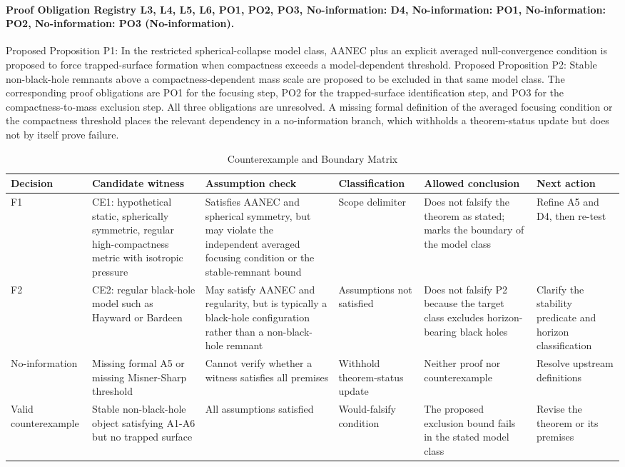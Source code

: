 \documentclass[conference]{IEEEtran}
\begin{document}
\paragraph{Proof Obligation Registry L3, L4, L5, L6, PO1, PO2, PO3, No-information: D4, No-information: PO1, No-information: PO2, No-information: PO3 (No-information).} Proposed Proposition P1: In the restricted spherical-collapse model class, AANEC plus an explicit averaged null-convergence condition is proposed to force trapped-surface formation when compactness exceeds a model-dependent threshold. Proposed Proposition P2: Stable non-black-hole remnants above a compactness-dependent mass scale are proposed to be excluded in that same model class. The corresponding proof obligations are PO1 for the focusing step, PO2 for the trapped-surface identification step, and PO3 for the compactness-to-mass exclusion step. All three obligations are unresolved. A missing formal definition of the averaged focusing condition or the compactness threshold places the relevant dependency in a no-information branch, which withholds a theorem-status update but does not by itself prove failure.

\begin{table}[htbp]
\centering
\footnotesize
\setlength{\tabcolsep}{3pt}
\renewcommand{\arraystretch}{1.12}
\caption{Counterexample and Boundary Matrix}
\label{tab:forward-derivation-and-counterexamples-b6}
\begin{tabular}{|p{}|p{}|p{}|p{}|p{}|p{}|}
\hline
Decision & Candidate witness & Assumption check & Classification & Allowed conclusion & Next action \\\hline
F1 & CE1: hypothetical static, spherically symmetric, regular high-compactness metric with isotropic pressure & Satisfies AANEC and spherical symmetry, but may violate the independent averaged focusing condition or the stable-remnant bound & Scope delimiter & Does not falsify the theorem as stated; marks the boundary of the model class & Refine A5 and D4, then re-test \\\hline
F2 & CE2: regular black-hole model such as Hayward or Bardeen & May satisfy AANEC and regularity, but is typically a black-hole configuration rather than a non-black-hole remnant & Assumptions not satisfied & Does not falsify P2 because the target class excludes horizon-bearing black holes & Clarify the stability predicate and horizon classification \\\hline
No-information & Missing formal A5 or missing Misner-Sharp threshold & Cannot verify whether a witness satisfies all premises & Withhold theorem-status update & Neither proof nor counterexample & Resolve upstream definitions \\\hline
Valid counterexample & Stable non-black-hole object satisfying A1-A6 but no trapped surface & All assumptions satisfied & Would-falsify condition & The proposed exclusion bound fails in the stated model class & Revise the theorem or its premises \\\hline
\end{tabular}
\end{table}
\end{document}
